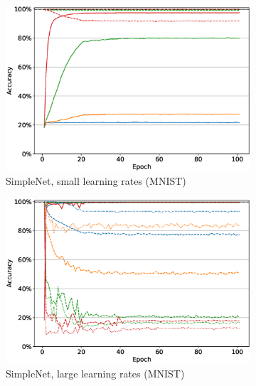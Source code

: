 \begin{figure}
     \centering
     \begin{subfigure}[b]{0.49\textwidth}
         \centering
         \includegraphics[width=\textwidth]{images/finetuning/finetuning_protecting_content_smalllr_thesis_simplenet_mnist.eps}
         \caption{SimpleNet, small learning rates (MNIST)}
         \label{fig:finetuning_simplenet_smalllr}
     \end{subfigure}
     \hfill
     \begin{subfigure}[b]{0.49\textwidth}
         \centering
         \includegraphics[width=\textwidth]{images/finetuning/finetuning_protecting_content_largelr_thesis_simplenet_mnist.eps}
         \caption{SimpleNet, large learning rates (MNIST)}
         \label{fig:finetuning_simplenet_largelr}
     \end{subfigure}
     \hfill
     \begin{subfigure}[b]{0.49\textwidth}

\end{subfigure}
\end{figure}
